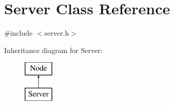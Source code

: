 \hypertarget{classServer}{}\section{Server Class Reference}
\label{classServer}


{\ttfamily \#include $<$server.\+h$>$}

Inheritance diagram for Server\+:\begin{figure}[H]
\begin{center}
\leavevmode
\includegraphics[height=2.000000cm]{classServer}
\end{center}
\end{figure}
